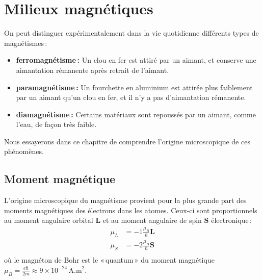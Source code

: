 \section{Milieux magnétiques}

    On peut distinguer expérimentalement dans la vie quotidienne différents types de magnétismes :
    \begin{itemize}
        \item \textbf{ferromagnétisme :} Un clou en fer est attiré par un aimant, et conserve une aimantation rémanente après retrait de l’aimant. 
        \item \textbf{paramagnétisme :} Un fourchette en aluminium est attirée plus faiblement par un aimant qu’un clou en fer, et il n’y a pas d’aimantation rémanente.
        \item \textbf{diamagnétisme :} Certains matériaux sont repoussés par un aimant, comme l’eau, de façon très faible.
    \end{itemize}
    Nous essayerons dans ce chapitre de comprendre l’origine microscopique de ces phénomènes.

    \subsection{Moment magnétique}

        L’origine microscopique du magnétisme provient pour la plus grande part des moments magnétiques des électrons dans les atomes. Ceux-ci sont proportionnels au moment angulaire orbital $\mathbf{L}$ et au moment angulaire de spin $\mathbf{S}$ électronique :
        \begin{align*}
            \mu_L &= - 1 \frac{\mu_B}{\hbar} \mathbf{L} \\
            \mu_S &= - 2 \frac{\mu_B}{\hbar} \mathbf{S} \\
        \end{align*}
        où le magnéton de Bohr est le « quantum » du moment magnétique $\mu_B = \frac{e\hbar}{2m} \approx 9 \times 10^{-24} \, \text{A.m}^2$.

